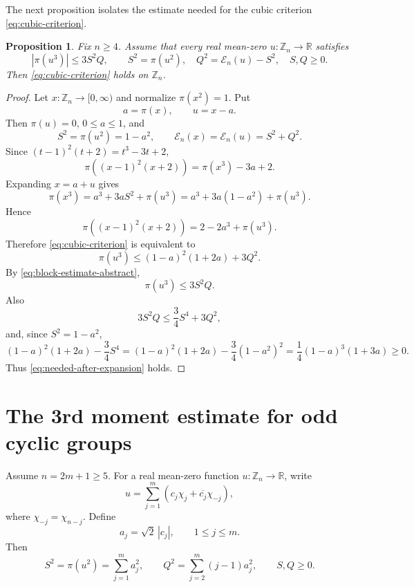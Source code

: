 \documentclass[11pt]{amsart}
\numberwithin{equation}{section}
\theoremstyle{plain}
\newtheorem{proposition}[theorem]{Proposition}
\theoremstyle{remark}
\newcommand{\RR}{\mathbb R}
\newcommand{\Zn}[1]{\mathbb Z_{#1}}
\newcommand{\ch}[1]{\chi_{#1}}
\newcommand{\coef}{c}
\newcommand{\Ssymbol}{S}
\newcommand{\Qsymbol}{Q}
\newcommand{\Ssq}{\Ssymbol^2}
\newcommand{\Qsq}{\Qsymbol^2}
\newcommand{\Sfour}{\Ssymbol^4}
\newcommand{\AvgSymbol}{\pi}
\newcommand{\Avg}[1]{\AvgSymbol\!\left(#1\right)}
\newcommand{\Energy}{\mathcal E}
\newcommand{\En}{\Energy_n}
\newcommand{\abs}[1]{\left|#1\right|}
\begin{document}
The next proposition isolates the estimate needed for the cubic criterion \eqref{eq:cubic-criterion}.

\begin{proposition}\label{prop:block-to-cubic}
Fix \(n\ge4\).  Assume that every real mean-zero \(u:\Zn{n}\to\RR\)
satisfies
\begin{equation}\label{eq:block-estimate-abstract}
  \abs{\Avg{u^3}}
  \le 3\Ssq\Qsymbol,
  \qquad
  \Ssq=\Avg{u^2},
  \quad
  \Qsq=\En(u)-\Ssq,
  \quad
  \Ssymbol,\Qsymbol\ge0.
\end{equation}
Then \eqref{eq:cubic-criterion} holds on \(\Zn{n}\).
\end{proposition}

\begin{proof}
Let \(x:\Zn{n}\to[0,\infty)\) and normalize \(\Avg{x^2}=1\).  Put
\[
  a=\Avg{x},\qquad u=x-a.
\]
Then \(\Avg{u}=0\), \(0\le a\le1\), and
\[
  \Ssq=\Avg{u^2}=1-a^2,
  \qquad
  \En(x)=\En(u)=\Ssq+\Qsq.
\]
Since \((t-1)^2(t+2)=t^3-3t+2\),
\[
  \Avg{(x-1)^2(x+2)}=\Avg{x^3}-3a+2.
\]
Expanding \(x=a+u\) gives
\[
  \Avg{x^3}=a^3+3a\Ssq+\Avg{u^3}
  =a^3+3a(1-a^2)+\Avg{u^3}.
\]
Hence
\begin{equation}\label{eq:cubic-expansion}
  \Avg{(x-1)^2(x+2)}=2-2a^3+\Avg{u^3}.
\end{equation}
Therefore \eqref{eq:cubic-criterion} is equivalent to
\begin{equation}\label{eq:needed-after-expansion}
  \Avg{u^3}\le (1-a)^2(1+2a)+3\Qsq.
\end{equation}
By \eqref{eq:block-estimate-abstract},
\[
  \Avg{u^3}\le 3\Ssq\Qsymbol.
\]
Also
\[
  3\Ssq\Qsymbol\le \frac34\Sfour+3\Qsq,
\]
and, since \(\Ssq=1-a^2\),
\[
  (1-a)^2(1+2a)-\frac34\Sfour
  =(1-a)^2(1+2a)-\frac34(1-a^2)^2
  =\frac14(1-a)^3(1+3a)\ge0.
\]
Thus \eqref{eq:needed-after-expansion} holds.
\end{proof}

\section{The 3rd moment estimate for odd cyclic groups}

Assume \(n=2m+1\ge5\).  For a real mean-zero function
\(u:\Zn{n}\to\RR\), write
\[
  u=\sum_{j=1}^{m}\left(\coef_j\ch{j}+\overline{\coef_j}\ch{-j}\right),
\]
where \(\ch{-j}=\ch{n-j}\).
Define
\[
  a_j=\sqrt2\,\abs{\coef_j},\qquad 1\le j\le m.
\]
Then
\[
  \Ssq=\Avg{u^2}=\sum_{j=1}^{m}a_j^2,
  \qquad
  \Qsq=\sum_{j=2}^{m}(j-1)a_j^2,
  \qquad \Ssymbol,\Qsymbol\ge0.
\]
\end{document}
